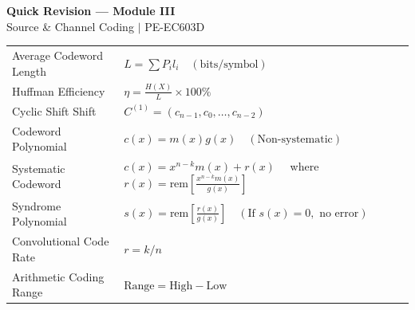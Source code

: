 \documentclass[12pt,a4paper]{article}
\renewcommand{\arraystretch}{1.45}
\begin{document}
\newpage
\begin{center}
  {\large\bfseries\color{myred} Quick Revision --- Module III}\\[3pt]
  {\small\color{mydark} Source \& Channel Coding $|$ PE-EC603D}
\end{center}
\noindent{\color{myred}\rule{\linewidth}{1.2pt}}
\vspace{4pt}

\begin{tcolorbox}[formulabox, title={\textbf{Key Formulas at a Glance}}]
\renewcommand{\arraystretch}{1.3}
\begin{tabularx}{\linewidth}{B{4.5cm} X}
Average Codeword Length & $L = \sum P_i l_i \quad (\text{bits/symbol})$ \\[4pt]
Huffman Efficiency      & $\eta = \frac{H(X)}{L} \times 100\%$ \\[4pt]
Cyclic Shift Shift      & $C^{(1)} = (c_{n-1}, c_0, \dots, c_{n-2})$ \\[4pt]
Codeword Polynomial     & $c(x) = m(x) g(x) \quad (\text{Non-systematic})$ \\[4pt]
Systematic Codeword     & $c(x) = x^{n-k} m(x) + r(x) \quad$ where $r(x) = \text{rem}\left[\frac{x^{n-k} m(x)}{g(x)}\right]$ \\[6pt]
Syndrome Polynomial     & $s(x) = \text{rem}\left[\frac{r(x)}{g(x)}\right] \quad (\text{If } s(x)=0, \text{ no error})$ \\[4pt]
Convolutional Code Rate & $r = k/n$ \\[4pt]
Arithmetic Coding Range & $\text{Range} = \text{High} - \text{Low}$
\end{tabularx}
\end{tcolorbox}
\end{document}
